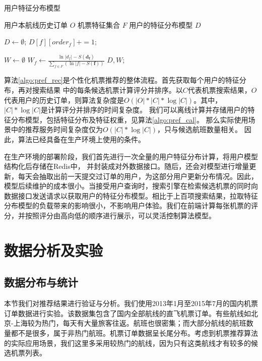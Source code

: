 \begin{algorithm}[!h]
\caption{用户特征分布模型}
\label{algo:pref_cal}
\begin{algorithmic}[1]
\Require
\Statex 用户本航线历史订单 $O$
\Statex 机票特征集合 $F$
\Ensure
\Statex 用户的特征分布模型 $D$

\State $D \gets \emptyset$;
\State $D[f][order_f] += 1$;
\EndFor	
\EndFor 

\State $W \gets \emptyset$
\State $W_f \gets \frac{\ln |d_f| - S(\mathbf{d_f})}{\sum_{f \in F}(\ln |f| - S(\mathbf{f}))}$
\EndFor
\State \Return $D,W$;
\EndFunction

\end{algorithmic}
\end{algorithm}


算法\ref{algo:pref_rec}是个性化机票推荐的整体流程。首先获取每个用户的特征分布，再对搜索结果
中的每条候选机票计算评分并排序。以$C$代表机票搜索结果，$O$代表用户的历史订单，则算法复杂度是$O(|O|*|C|*\log|C|)$。其中，$|C|*\log|C|$是计算评分并排序的时间复杂度。
我们可以离线计算并存储用户的特征分布模型，包括特征分布及特征权重，见算法\ref{algo:pref_cal}。
那么实际使用场景中的推荐服务时间复杂度仅为$O(|C|*\log|C|)$，只与候选航班数量相关。
因此，算法已经具备在生产环境上使用的条件。

在生产环境的部署阶段，我们首先进行一次全量的用户特征分布计算，将用户模型结构化后存储在Redis中，
并封装成对外数据接口。随后，还会对模型进行增量更新，每天会抽取出前一天提交过订单的用户，为这部分用户更新分布情况。因此，模型后续维护的成本很小。当接受用户查询时，搜索引擎在检索候选机票的同时向数据接口发送请求以获取用户的特征分布模型。相比于上百项搜索结果，拉取特征分布模型的负载带来的影响很小，不影响用户体验。我们在前端计算每张机票的评分，并按照评分由高向低的顺序进行展示，可以灵活控制算法模型。

\section{数据分析及实验}

\subsection{数据分布与统计}
本节我们对推荐结果进行验证与分析。我们使用2013年1月至2015年7月的国内机票订单数据进行实验。该数据集包含了国内全部航线的直飞机票订单。有些航线如北京-上海较为热门，每天有大量旅客往返。航班也很密集；而大部分航线的航班数量都不是很多，属于非热门航班。机票订单数据呈长尾分布。考虑到机票推荐算法的实际应用场景，我们这里多采用较热门的航线，因为只有这类航线才有较多的候选机票列表。

